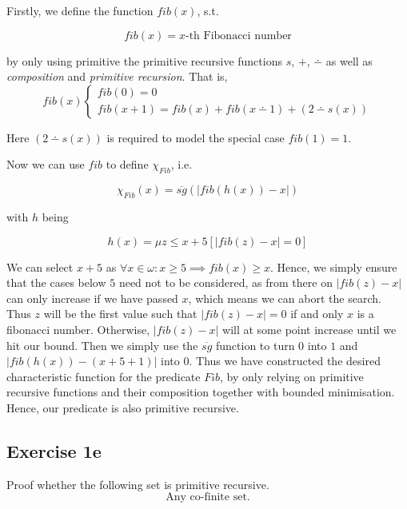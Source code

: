 \documentclass[11pt,a4paper]{article}
\begin{document}
\bigbreak

Firstly, we define the function $fib(x)$, s.t.

\begin{equation*}
fib(x) = x \text{-th Fibonacci number}
\end{equation*}

by only using primitive the primitive recursive functions $s$, $+$, $\dotminus$ as well as \emph{composition} and \emph{primitive recursion}. That is,
\begin{equation*}
fib(x)
\begin{cases}
   fib(0) = 0         \\
   fib(x+1) = fib(x) + fib(x \dotminus 1) + (2 \dotminus s(x))
 \end{cases}
\end{equation*}									

Here $(2 \dotminus s(x))$ is required to model the special case $fib(1)=1$.

Now we can use $fib$ to define $\chi_{Fib}$, i.e.

\begin{equation*}
\chi_{Fib}(x)= \overline{sg}(|fib(h(x)) - x|)
\end{equation*}

with $h$ being

\begin{equation*}
h(x) = \mu z \leq x+5[|fib(z)-x| = 0]
\end{equation*}


We can select $x+5$ as $\forall x \in \omega: x \geq 5 \implies  fib(x) \geq x$. Hence, we simply ensure that 
the cases below $5$ need not to be considered, as from there on $|fib(z)-x|$ can only increase if we have passed $x$, which means
we can abort the search. Thus $z$ will be the first value such that $|fib(z)-x|=0$ if and only  $x$ is a fibonacci number. Otherwise, 
$|fib(z)-x|$ will at some point increase until we hit our bound.
Then we simply use the $\overline{sg}$ function to turn $0$ into $1$ and $|fib(h(x)) - (x+5+1)|$ into $0$. 
Thus we have constructed the desired characteristic function for the predicate $Fib$, by only relying on primitive recursive functions and their composition together with bounded minimisation.
Hence, our predicate is also primitive recursive.


\subsection*{Exercise 1e}
Proof whether the following set is primitive recursive.
\begin{equation*}
\text{Any co-finite set.}
\end{equation*}
\end{document}
